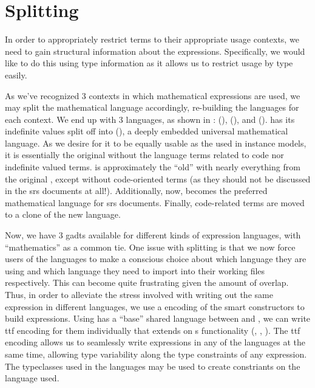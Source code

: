 \section{Splitting}
\label{chap:lang-division:sec:splitting}

In order to appropriately restrict terms to their appropriate usage contexts, we
need to gain structural information about the expressions. Specifically, we
would like to do this using type information as it allows us to restrict usage
by type easily.

\languageDivision{}

As we've recognized 3 contexts in which mathematical expressions are used, we
may split the mathematical language accordingly, re-building the languages for
each context. We end up with 3 languages, as shown in :
\Expr{} (), \ModelExpr{}
(), and \CodeExpr{} ().
\Expr{} has its indefinite values split off into \ModelExpr{}
(), a deeply embedded universal mathematical
language. As we desire for it to be equally usable as the \Expr{} used in
instance models, it is essentially the original \Expr{} without the language
terms related to code nor indefinite valued terms. \ModelExpr{} is approximately
the ``old'' \Expr{} with nearly everything from the original \Expr{}, except
without code-oriented terms (as they should not be discussed in the \acs{srs}
documents at all!). Additionally, now, \ModelExpr{} becomes the preferred
mathematical language for \acs{srs} documents. Finally, code-related terms are
moved to a clone of the new \Expr{} language.

Now, we have 3 \acsp{gadt} available for different kinds of expression
languages, with ``mathematics'' as a common tie. One issue with splitting is
that we now force users of the languages to make a conscious choice about which
language they are using and which language they need to import into their
working files respectively. This can become quite frustrating given the amount
of overlap. Thus, in order to alleviate the stress involved with writing out the
same expression in different languages, we use a  encoding of the smart
constructors to build expressions. Using \Expr{} has a ``base'' shared language
between \ModelExpr{} and \CodeExpr{}, we can write \acs{ttf} encoding for them
individually that extends on \Expr{}s functionality
(, ,
). The \acs{ttf} encoding allows us to seamlessly
write expressions in any of the languages at the same time, allowing type
variability along the type constraints of any expression. The typeclasses used
in the languages may be used to create constriants on the language used.

